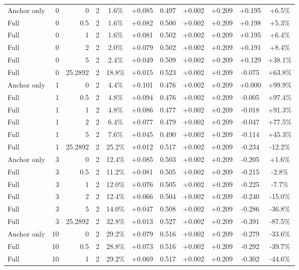 \begin{table}[htbp]
\begin{tabular}{lrrrccccccc}
Anchor only & 0 & 0 & 2 & 1.6\% & +0.085 & 0.497 & +0.002 & +0.209 & +0.195 & +6.5\% \\
Full & 0 & 0.5 & 2 & 1.6\% & +0.082 & 0.500 & +0.002 & +0.209 & +0.198 & +5.3\% \\
Full & 0 & 1 & 2 & 1.6\% & +0.081 & 0.502 & +0.002 & +0.209 & +0.195 & +6.4\% \\
Full & 0 & 2 & 2 & 2.0\% & +0.079 & 0.502 & +0.002 & +0.209 & +0.191 & +8.4\% \\
Full & 0 & 5 & 2 & 2.4\% & +0.049 & 0.509 & +0.002 & +0.209 & +0.129 & +38.1\% \\
Full & 0 & 25.2892 & 2 & 18.8\% & +0.015 & 0.523 & +0.002 & +0.209 & -0.075 & +63.8\% \\
Anchor only & 1 & 0 & 2 & 4.4\% & +0.101 & 0.476 & +0.002 & +0.209 & +0.000 & +99.9\% \\
Full & 1 & 0.5 & 2 & 4.8\% & +0.094 & 0.476 & +0.002 & +0.209 & -0.005 & +97.4\% \\
Full & 1 & 1 & 2 & 4.8\% & +0.086 & 0.477 & +0.002 & +0.209 & -0.018 & +91.3\% \\
Full & 1 & 2 & 2 & 6.4\% & +0.077 & 0.479 & +0.002 & +0.209 & -0.047 & +77.5\% \\
Full & 1 & 5 & 2 & 7.6\% & +0.045 & 0.490 & +0.002 & +0.209 & -0.114 & +45.3\% \\
Full & 1 & 25.2892 & 2 & 25.2\% & +0.012 & 0.517 & +0.002 & +0.209 & -0.234 & -12.2\% \\
Anchor only & 3 & 0 & 2 & 12.4\% & +0.085 & 0.503 & +0.002 & +0.209 & -0.205 & +1.6\% \\
Full & 3 & 0.5 & 2 & 11.2\% & +0.081 & 0.505 & +0.002 & +0.209 & -0.215 & -2.8\% \\
Full & 3 & 1 & 2 & 12.0\% & +0.076 & 0.505 & +0.002 & +0.209 & -0.225 & -7.7\% \\
Full & 3 & 2 & 2 & 12.4\% & +0.066 & 0.504 & +0.002 & +0.209 & -0.240 & -15.0\% \\
Full & 3 & 5 & 2 & 14.0\% & +0.047 & 0.508 & +0.002 & +0.209 & -0.286 & -36.8\% \\
Full & 3 & 25.2892 & 2 & 32.8\% & +0.013 & 0.527 & +0.002 & +0.209 & -0.391 & -87.5\% \\
Anchor only & 10 & 0 & 2 & 29.2\% & +0.079 & 0.516 & +0.002 & +0.209 & -0.279 & -33.6\% \\
Full & 10 & 0.5 & 2 & 28.8\% & +0.073 & 0.516 & +0.002 & +0.209 & -0.292 & -39.7\% \\
Full & 10 & 1 & 2 & 29.2\% & +0.069 & 0.517 & +0.002 & +0.209 & -0.302 & -44.6\% \\

\end{tabular}
\end{table}
